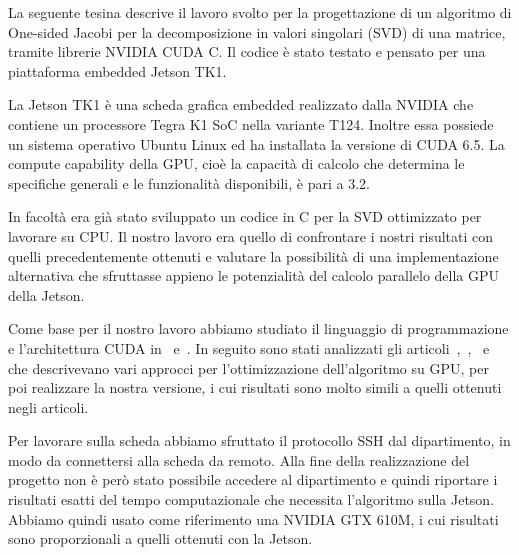 \label{sec:Introduzione}
La seguente tesina descrive il lavoro svolto per la progettazione di un algoritmo di One-sided Jacobi per la decomposizione in valori singolari (SVD) di una matrice, tramite librerie NVIDIA CUDA C. Il codice è stato testato e pensato per una piattaforma embedded Jetson TK1.

La Jetson TK1 è una scheda grafica embedded realizzato dalla NVIDIA che contiene un processore Tegra K1 SoC nella variante T124. Inoltre essa possiede un sistema operativo Ubuntu Linux ed ha installata la versione di CUDA 6.5. La compute capability della GPU, cioè la capacità di calcolo che determina le specifiche generali e le funzionalità disponibili, è pari a 3.2.

In facoltà era già stato sviluppato un codice in C per la SVD ottimizzato per lavorare su CPU. Il nostro lavoro era quello di confrontare i nostri risultati con quelli precedentemente ottenuti e valutare la possibilità di una implementazione alternativa che sfruttasse appieno le potenzialità del calcolo parallelo della GPU della Jetson.

Come base per il nostro lavoro abbiamo studiato il linguaggio di programmazione e l’architettura CUDA in~\cite{Cheng:ProfessionalCudaProgramming} e~\cite{Sanders:CudaByExample}. In seguito sono stati analizzati gli articoli~\cite{Acosta:SVD},~\cite{Boukaram:SVD},~\cite{Lahabar:SVD} e~\cite{Romer:SVD} che descrivevano vari approcci per l’ottimizzazione dell’algoritmo su GPU, per poi realizzare la nostra versione, i cui risultati sono molto simili a quelli ottenuti negli articoli. 

Per lavorare sulla scheda abbiamo sfruttato il protocollo SSH dal dipartimento, in modo da connettersi alla scheda da remoto. Alla fine della realizzazione del progetto non è però stato possibile accedere al dipartimento e quindi riportare i risultati esatti del tempo computazionale che necessita l’algoritmo sulla Jetson. Abbiamo quindi usato come riferimento una NVIDIA GTX 610M, i cui risultati sono proporzionali a quelli ottenuti con la
Jetson.